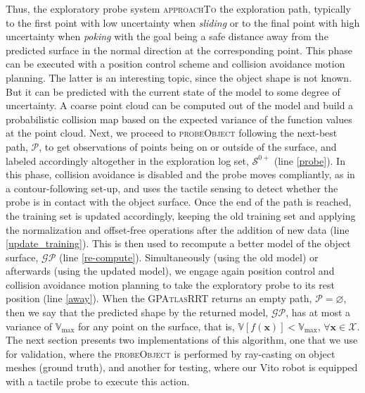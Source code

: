 Thus, the exploratory probe system \textsc{approachTo} the exploration path, typically to the first point with low uncertainty when \emph{sliding} or to the final point with high uncertainty when \emph{poking} with the goal being a safe distance away from the predicted surface in the normal direction at the corresponding point. This phase can be executed with a position control scheme and collision avoidance motion planning. The latter is an interesting topic, since the object shape is not known. But it can be predicted with the current state of the model to some degree of uncertainty. A coarse point cloud can be computed out of the model and build a probabilistic collision map based on the expected variance of the function values at the point cloud. Next, we proceed to \textsc{probeObject} following the next-best path, $\mathcal{P}$, to get observations of points being on or outside of the surface, and labeled accordingly altogether in the exploration log set, $\mathcal{S}^{0+}$ (line \ref{probe}). In this phase, collision avoidance is disabled and the probe moves compliantly, as in a contour-following set-up, and uses the tactile sensing to detect whether the probe is in contact with the object surface. Once the end of the path is reached, the training set is updated accordingly, keeping the old training set and applying the normalization and offset-free operations after the addition of new data (line \ref{update_training}). This is then used to recompute a better model of the object surface, $\mathcal{GP}$ (line \ref{re-compute}). Simultaneously (using the old model) or afterwards (using the updated model), we engage again position control and collision avoidance motion planning to take the exploratory probe to its rest position (line \ref{away}). When the \textsc{GPAtlasRRT} returns an empty path, $\mathcal{P} = \varnothing$, then we say that the predicted shape by the returned model, $\mathcal{GP}$, has at most a variance of $\mathbb{V}_{\max}$ for any point on the surface, that is, $\mathbb{V}[f(\mathbf{x})] < \mathbb{V}_{\max}, \, \forall \mathbf{x} \in \mathcal{X}$. The next section presents two implementations of this algorithm, one that we use for validation, where the \textsc{probeObject} is performed by ray-casting on object meshes (ground truth), and another for testing, where our Vito robot is equipped with a tactile probe to execute this action.

